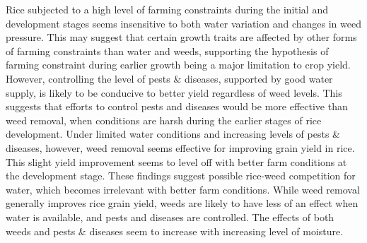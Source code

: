 \documentclass[]{elsarticle} %
\begin{document}
Rice subjected to a high level of farming constraints during the initial and development stages seems insensitive to both water variation and changes in weed pressure. This may suggest that certain growth traits are affected by other forms of farming constraints than water and weeds, supporting the hypothesis of farming constraint during earlier growth being a major limitation to crop yield. However, controlling the level of pests \& diseases, supported by good water supply, is likely to be conducive to better yield regardless of weed levels. This suggests that efforts to control pests and diseases would be more effective than weed removal, when conditions are harsh during the earlier stages of rice development. Under limited water conditions and increasing levels of pests \& diseases, however, weed removal seems effective for improving grain yield in rice. This slight yield improvement seems to level off with better farm conditions at the development stage. These findings suggest possible rice-weed competition for water, which becomes irrelevant with better farm conditions. While weed removal generally improves rice grain yield, weeds are likely to have less of an effect when water is available, and pests and diseases are controlled. The effects of both weeds and pests \& diseases seem to increase with increasing level of moisture.
\end{document}
